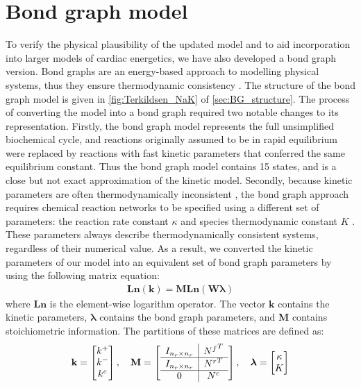 \documentclass[fleqn,10pt]{physiome}
\begin{document}
\section{Bond graph model}
To verify the physical plausibility of the updated model and to aid incorporation into larger models of cardiac energetics, we have also developed a bond graph version. Bond graphs are an energy-based approach to modelling physical systems, thus they ensure thermodynamic consistency \citep{gawthrop_energy-based_2014}. The structure of the bond graph model is given in \autoref{fig:Terkildsen_NaK} of \autoref{sec:BG_structure}. The process of converting the model into a bond graph required two notable changes to its representation. Firstly, the bond graph model represents the full unsimplified biochemical cycle, and reactions originally assumed to be in rapid equilibrium were replaced by reactions with fast kinetic parameters that conferred the same equilibrium constant. Thus the bond graph model contains 15 states, and is a close but not exact approximation of the kinetic model. Secondly, because kinetic parameters are often thermodynamically inconsistent \citep{liebermeister_modular_2010}, the bond graph approach requires chemical reaction networks to be specified using a different set of parameters: the reaction rate constant $\kappa$ and species thermodynamic constant $K$ \citep{gawthrop_energy-based_2014}. These parameters always describe thermodynamically consistent systems, regardless of their numerical value. As a result, we converted the kinetic parameters of our model into an equivalent set of bond graph parameters \citep{gawthrop_hierarchical_2015} by using the following matrix equation:
\begin{align}
	\textbf{Ln}(\mathbf{k}) = \mathbf{M} \textbf{Ln}(\mathbf{W} \boldsymbol{\lambda}) \label{eq:bg_general}
\end{align}
where $\textbf{Ln}$ is the element-wise logarithm operator. The vector $\mathbf{k}$ contains the kinetic parameters, $\boldsymbol{\lambda}$ contains the bond graph parameters, and $\mathbf{M}$ contains stoichiometric information. The partitions of these matrices are defined as:
\begin{align}
	\textbf{k} = \begin{bmatrix}
	k^+ \\ k^- \\ k^c
	\end{bmatrix}, \quad
	\textbf{M} = \left[ \begin{array}{c | c}
	I_{n_r \times n_r} & {N^f}^T \\ \hline
	I_{n_r \times n_r} & {N^r}^T \\ \hline
	0 & N^c
	\end{array} \right], \quad
	\boldsymbol{\lambda} = \begin{bmatrix}
	\kappa \\ K
	\end{bmatrix}
	\label{eq:standard}
\end{align}
\end{document}

